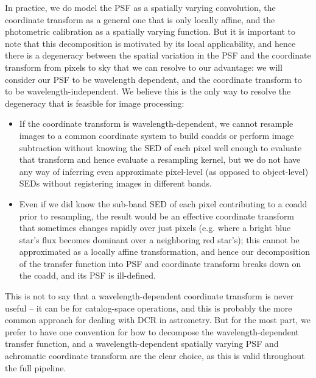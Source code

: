 \documentclass[DM,authoryear,toc]{lsstdoc}
\begin{document}
In practice, we do model the PSF as a spatially varying convolution, the coordinate transform as a general one that is only locally affine, and the photometric calibration as a spatially varying function.
But it is important to note that this decomposition is motivated by its local applicability, and hence there is a degeneracy between the spatial variation in the PSF and the coordinate transform from pixels to sky that we can resolve to our advantage: we will consider our PSF to be wavelength dependent, and the coordinate transform to to be wavelength-independent.
We believe this is the only way to resolve the degeneracy that is feasible for image processing:
\begin{itemize}
\item If the coordinate transform is wavelength-dependent, we cannot resample images to a common coordinate system to build coadds or perform image subtraction without knowing the SED of each pixel well enough to evaluate that transform and hence evaluate a resampling kernel, but we do not have any way of inferring even approximate pixel-level (as opposed to object-level) SEDs without registering images in different bands.
\item Even if we did know the sub-band SED of each pixel contributing to a coadd prior to resampling, the result would be an effective coordinate transform that sometimes changes rapidly over just pixels (e.g. where a bright blue star's flux becomes dominant over a neighboring red star's); this cannot be approximated as a locally affine transformation, and hence our decomposition of the transfer function into PSF and coordinate transform breaks down on the coadd, and its PSF is ill-defined.
\end{itemize}
This is not to say that a wavelength-dependent coordinate transform is never useful -- it can be for catalog-space operations, and this is probably the more common approach for dealing with DCR in astrometry.
But for the most part, we prefer to have one convention for how to decompose the wavelength-dependent transfer function, and a wavelength-dependent spatially varying PSF and achromatic coordinate transform are the clear choice, as this is valid throughout the full pipeline.
\end{document}
